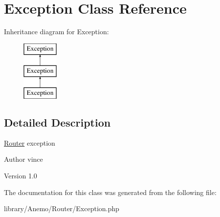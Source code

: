 \hypertarget{class_anemo_1_1_router_1_1_exception}{
\section{Exception Class Reference}
\label{class_anemo_1_1_router_1_1_exception}
}
Inheritance diagram for Exception:\begin{figure}[H]
\begin{center}
\leavevmode
\includegraphics[height=3.000000cm]{class_anemo_1_1_router_1_1_exception}
\end{center}
\end{figure}


\subsection{Detailed Description}
\hyperlink{class_anemo_1_1_router}{Router} exception \begin{DoxyAuthor}{Author}
vince 
\end{DoxyAuthor}
\begin{DoxyVersion}{Version}
1.0 
\end{DoxyVersion}


The documentation for this class was generated from the following file:\begin{DoxyCompactItemize}
\item 
library/Anemo/Router/Exception.php\end{DoxyCompactItemize}
